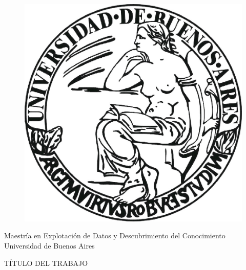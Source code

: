 \documentclass[10 pt]{article}
\begin{document}
\begin{titlepage}

    \begin{center}
    \vspace*{-0.5in}
    \begin{figure}[htb]
    \begin{center}
    \includegraphics[scale=.3]{images/uba2.jpg}
    \end{center}
    \end{figure}
    
    \begin{large}
    Maestría en Explotación de Datos y Descubrimiento del Conocimiento\\
    \vspace*{0.15in}
    Universidad de Buenos Aires \\
    
    \vspace*{0.6in}
    \end{large}
    
    \begin{large}
    TÍTULO DEL TRABAJO\\
    
    
    \end{large}
    \vspace*{0.2in}
    \vspace*{0.3in}
    

\end{center}
\end{titlepage}
\end{document}
